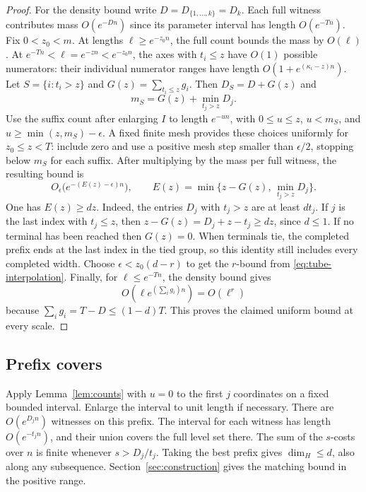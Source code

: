 \documentclass[11pt,a4paper,reqno]{amsart}
\theoremstyle{definition}
\theoremstyle{remark}
\numberwithin{equation}{section}
\begin{document}
\begin{proof}
For the density bound write \(D=D_{\{1,\ldots,k\}}=D_k\). Each full witness contributes mass \(O(e^{-Dn})\) since its parameter interval has length \(O(e^{-Tn})\). Fix \(0<z_0<m\). At lengths \(\ell\ge e^{-z_0n}\), the full count bounds the mass by \(O(\ell)\). At \(e^{-Tn}<\ell=e^{-zn}<e^{-z_0n}\), the axes with \(t_i\le z\) have \(O(1)\) possible numerators: their individual numerator ranges have length \(O(1+e^{(\kappa_i-z)n})\). Let \(S=\{i:t_i>z\}\) and \(G(z)=\sum_{t_i\le z}g_i\). Then \(D_S=D+G(z)\) and
\[
   m_S=G(z)+\min_{t_j>z} D_j.
\]
Use the suffix count after enlarging \(I\) to length \(e^{-un}\), with \(0\le u\le z\), \(u<m_S\), and \(u\ge\min(z,m_S)-\epsilon\). A fixed finite mesh provides these choices uniformly for \(z_0\le z<T\): include zero and use a positive mesh step smaller than \(\epsilon/2\), stopping below \(m_S\) for each suffix. After multiplying by the mass per full witness, the resulting bound is
\begin{equation}\label{eq:tube-interpolation}
  O_\epsilon\big(e^{-(E(z)-\epsilon)n}\big),\qquad
  E(z)=\min\big\{z-G(z),\,\min_{t_j>z} D_j\big\}.
\end{equation}
One has \(E(z)\ge dz\). Indeed, the entries \(D_j\) with \(t_j>z\) are at least \(dt_j\). If \(j\) is the last index with \(t_j\le z\), then \(z-G(z)=D_j+z-t_j\ge dz\), since \(d\le1\). If no terminal has been reached then \(G(z)=0\). When terminals tie, the completed prefix ends at the last index in the tied group, so this identity still includes every completed width. Choose \(\epsilon<z_0(d-r)\) to get the \(r\)-bound from \eqref{eq:tube-interpolation}. Finally, for \(\ell\le e^{-Tn}\), the density bound gives
\[
  O\!\left(\ell e^{(\sum_i g_i)n}\right)=O(\ell^r)
\]
because \(\sum_i g_i=T-D\le (1-d)T\). This proves the claimed uniform bound at every scale.
\end{proof}

\subsection{Prefix covers}
Apply Lemma~\ref{lem:counts} with \(u=0\) to the first \(j\) coordinates on a fixed bounded interval. Enlarge the interval to unit length if necessary. There are \(O(e^{D_j n})\) witnesses on this prefix. The interval for each witness has length \(O(e^{-t_j n})\), and their union covers the full level set there. The sum of the \(s\)-costs over \(n\) is finite whenever \(s>D_j/t_j\). Taking the best prefix gives \(\dim_H\le d\), also along any subsequence. Section~\ref{sec:construction} gives the matching bound in the positive range.
\end{document}
